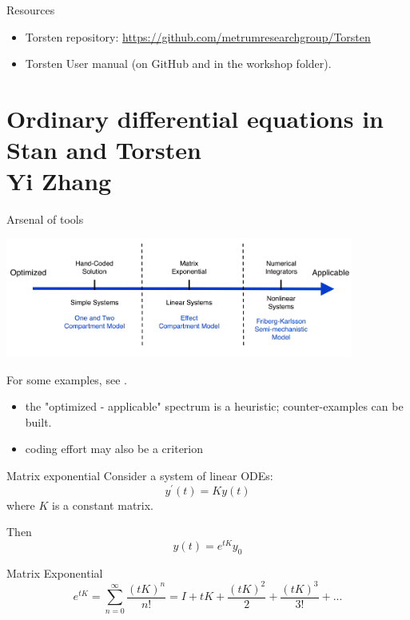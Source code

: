 \documentclass[presentation]{beamer}
\begin{document}
\begin{frame}[label={sec:orgb0687cd}]{Resources}
\begin{itemize}
\item Torsten repository: \url{https://github.com/metrumresearchgroup/Torsten}
\item Torsten User manual (on GitHub and in the workshop folder).
\end{itemize}
\end{frame}

\section{Ordinary differential equations in Stan and Torsten \\ \footnotesize{Yi Zhang}}
\label{sec:org61012cd}
\begin{frame}[label={sec:orgb4dd30b}]{Arsenal of tools}
\begin{latex}
\begin{center}
  \includegraphics[width=4.5in]{odeSolvers.png}
\end{center}
\end{latex}
For some examples, see \cite{Margossian:2017}.
\begin{block}{}
\begin{itemize}
\item the "optimized - applicable" spectrum is a heuristic; counter-examples can be built.
\item coding effort may also be a criterion
\end{itemize}
\end{block}
\end{frame}
\begin{frame}[label={sec:orgd363697}]{Matrix exponential}
Consider a system of linear ODEs:
$$ y^\prime(t) = Ky(t) $$
where \(K\) is a constant matrix.

Then
$$ y(t) = e^{tK} y_0 $$
\end{frame}
\begin{frame}[label={sec:org4ab4e9e}]{Matrix Exponential}
$$ e^{tK} = \sum_{n=0}^{\infty} \dfrac{(tK)^n}{n!} = I + tK + \frac{(tK)^2}{2} + \frac{(tK)^3}{3!} + ... $$
\end{frame}
\end{document}
